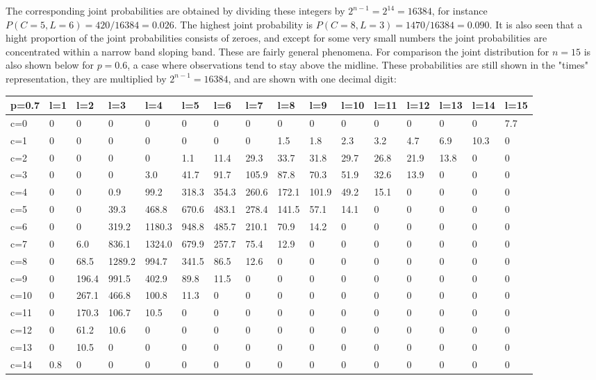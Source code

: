 \normalsize

The corresponding joint probabilities are obtained by dividing these integers by $2^{n-1}=2^{14}=16384$, for instance $P(C=5, L=6)=420/16384=0.026$. The highest joint probability is $P(C=8, L=3)=1470/16384=0.090$. It is also seen that a hight proportion of the joint probabilities consists of zeroes, and except for some very small numbers the joint probabilities are concentrated within a narrow band sloping band. These are fairly general phenomena. For comparison the joint distribution for $n = 15$ is also shown below for $p = 0.6$, a case where observations tend to stay above the midline. These probabilities are still shown in the "times" representation, they are multiplied by $2^{n-1}=16384$, and are shown with one decimal digit:

\tiny{
\begin{tabular}{l | l l l l l l l l l l l l l l l}
\hline
p=0.7&l=1&l=2&l=3&l=4&l=5&l=6&l=7&l=8&l=9&l=10&l=11&l=12&l=13&l=14&l=15\\
\hline
c=0&0&0&0&0&0&0&0&0&0&0&0&0&0&0&7.7\\
c=1&0&0&0&0&0&0&0&1.5&1.8&2.3&3.2&4.7&6.9&10.3&0\\
c=2&0&0&0&0&1.1&11.4&29.3&33.7&31.8&29.7&26.8&21.9&13.8&0&0\\
c=3&0&0&0&3.0&41.7&91.7&105.9&87.8&70.3&51.9&32.6&13.9&0&0&0\\
c=4&0&0&0.9&99.2&318.3&354.3&260.6&172.1&101.9&49.2&15.1&0&0&0&0\\
c=5&0&0&39.3&468.8&670.6&483.1&278.4&141.5&57.1&14.1&0&0&0&0&0\\
c=6&0&0&319.2&1180.3&948.8&485.7&210.1&70.9&14.2&0&0&0&0&0&0\\
c=7&0&6.0&836.1&1324.0&679.9&257.7&75.4&12.9&0&0&0&0&0&0&0\\
c=8&0&68.5&1289.2&994.7&341.5&86.5&12.6&0&0&0&0&0&0&0&0\\
c=9&0&196.4&991.5&402.9&89.8&11.5&0&0&0&0&0&0&0&0&0\\
c=10&0&267.1&466.8&100.8&11.3&0&0&0&0&0&0&0&0&0&0\\
c=11&0&170.3&106.7&10.5&0&0&0&0&0&0&0&0&0&0&0\\
c=12&0&61.2&10.6&0&0&0&0&0&0&0&0&0&0&0&0\\
c=13&0&10.5&0&0&0&0&0&0&0&0&0&0&0&0&0\\
c=14&0.8&0&0&0&0&0&0&0&0&0&0&0&0&0&0\\
\hline
\end{tabular}
}

\normalsize

